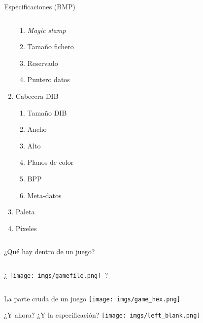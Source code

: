 \begin{frame}{Especificaciones (BMP)}
\begin{columns}
\begin{column}[T]{0.4\textwidth}
\begin{enumerate}
\begin{enumerate}
                \item<2-> \textit{Magic stamp}
                \item<3-> Tamaño fichero
                \item<4-> Reservado
                \item<5-> Puntero datos
            \end{enumerate}
            \item<6-> Cabecera DIB
            \begin{enumerate}
                \item<7-> Tamaño DIB
                \item<8-> Ancho
                \item<9-> Alto
                \item<10-> Planos de color
                \item<11-> BPP
                \item<12-> Meta-datos
            \end{enumerate}
            \item<13-> Paleta
            \item<14-> Píxeles
        \end{enumerate}
    \end{column}
    \end{columns}
\end{frame}

\begin{frame}{¿Qué hay dentro de un juego?}
    \fontsize{45}{0}\selectfont
    \begin{columns}
    \begin{column}{0.65\textwidth}
        ¿ \texttt{[image: imgs/gamefile.png]}~?
    \end{column}
    \hfill
    \begin{column}{0.35\textwidth}
    \end{column}
    \end{columns}
\end{frame}

\begin{frame}{La parte cruda de un juego}
    \texttt{[image: imgs/game\_hex.png]}
\end{frame}

\begin{frame}{¿Y ahora? ¿Y la especificación?}
    \texttt{[image: imgs/left\_blank.png]}
\end{frame}

